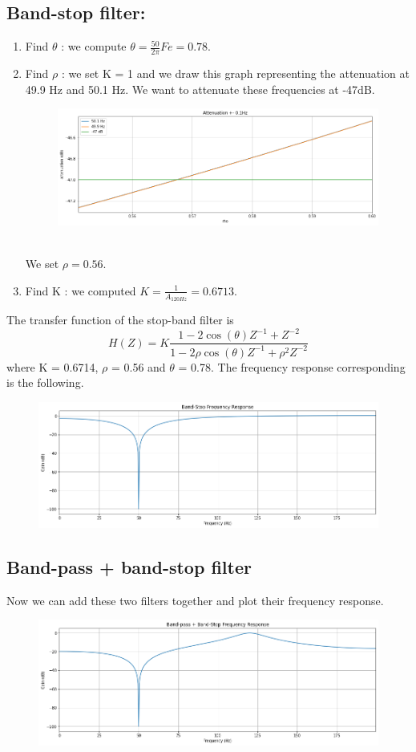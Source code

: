 \documentclass[]{article}
\begin{document}
\subsection*{Band-stop filter:}
\begin{enumerate}
    \item Find $\theta$ : we compute $\theta = \frac{50}{2\pi}Fe = 0.78$.
    \item Find $\rho$ : we set K = 1 and we draw this graph representing the attenuation at 49.9 Hz and 50.1 Hz. 
    We want to attenuate these frequencies at -47dB.
    \begin{figure}[h]
        \centering
        \includegraphics[scale=0.5]{q13.png}
    \end{figure}\\
    We set $\rho = 0.56$.
    \item Find K : we computed $K = \frac{1}{A_{120Hz}}=0.6713$.
\end{enumerate}
The transfer function of the stop-band filter is 
$$H(Z) = K\frac{1 - 2\cos{(\theta)} Z^{-1} + Z^{-2}}{1 - 2\rho \cos{(\theta)Z^{-1} +\rho^2Z^{-2}}}$$
where K = 0.6714, $\rho$ = 0.56 and $\theta$ = 0.78. The frequency response corresponding is the following.

\begin{figure}[H]
    \centering
    \includegraphics[scale=0.5]{q14.png}
\end{figure}

\subsection*{Band-pass + band-stop filter}

Now we can add these two filters together and plot their frequency response. 
\begin{figure}[H]
    \centering
    \includegraphics[scale=0.5]{q15.png}
\end{figure}
\end{document}

